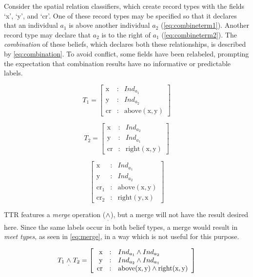 Consider the spatial relation classifiers, which create record types with the fields `x', `y', and `cr'.
One of these record types may be specified so that it declares that an individual $a_1$ is above another individual $a_2$ (\autoref{eq:combineterm1}).
Another record type may declare that $a_2$ is to the right of $a_1$ (\autoref{eq:combineterm2}).
The \textit{combination} of these beliefs, which declares both these relationships, is described by \autoref{eq:combination}.
To avoid conflict, some fields have been relabeled, prompting the expectation that combination results have no informative or predictable labels.

\begin{equation} \label{eq:combineterm1}
T_1 = \left[\begin{array}{rcl}
    \text{x} &:& Ind_{a_1} \\
    \text{y} &:& Ind_{a_2} \\
    \text{cr} &:& \text{above}(\text{x}, \text{y})
    \end{array}\right]
\end{equation}

\begin{equation} \label{eq:combineterm2}
T_2 = \left[\begin{array}{rcl}
    \text{x} &:& Ind_{a_2} \\
    \text{y} &:& Ind_{a_1} \\
    \text{cr} &:& \text{right}(\text{x}, \text{y})
    \end{array}\right]
\end{equation}

\begin{equation} \label{eq:combination}
\left[\begin{array}{rcl}
    \text{x} &:& Ind_{a_1} \\
    \text{y} &:& Ind_{a_2} \\
    \text{cr}_1 &:& \text{above}(\text{x}, \text{y}) \\
    \text{cr}_2 &:& \text{right}(\text{y}, \text{x})
    \end{array}\right]
\end{equation}

TTR features a \textit{merge} operation ($\mathrel{\underset\cdot\wedge}$), but a merge will not have the result desired here.
Since the same labels occur in both belief types, a merge would result in \textit{meet types}, as seen in \autoref{eq:merge}, in a way which is not useful for this purpose.

\begin{equation} \label{eq:merge}
T_1  \mathrel{\underset\cdot\wedge} T_2 =
\left[\begin{array}{rcl}
    \text{x} &:& Ind_{a_1} \wedge Ind_{a_2} \\
    \text{y} &:& Ind_{a_2} \wedge Ind_{a_1} \\
    \text{cr} &:& \text{above}(\text{x}, \text{y}) \wedge \text{right}(\text{x}, \text{y})
    \end{array}\right]
\end{equation}


